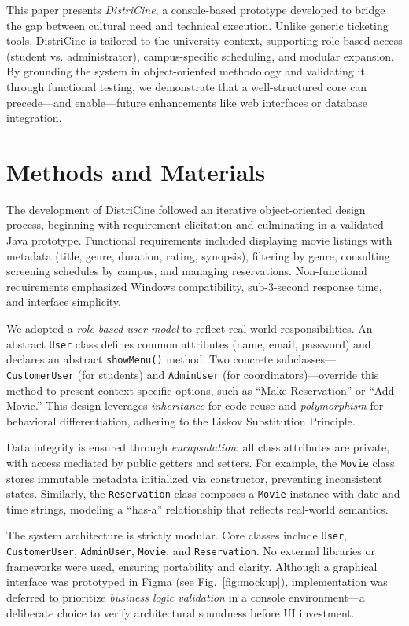 \documentclass[10pt, conference]{IEEEtran}
\begin{document}
This paper presents \textit{DistriCine}, a console-based prototype developed to bridge the gap between cultural need and technical execution. Unlike generic ticketing tools, DistriCine is tailored to the university context, supporting role-based access (student vs. administrator), campus-specific scheduling, and modular expansion. By grounding the system in object-oriented methodology and validating it through functional testing, we demonstrate that a well-structured core can precede—and enable—future enhancements like web interfaces or database integration.

\section{Methods and Materials}

The development of DistriCine followed an iterative object-oriented design process, beginning with requirement elicitation and culminating in a validated Java prototype. Functional requirements included displaying movie listings with metadata (title, genre, duration, rating, synopsis), filtering by genre, consulting screening schedules by campus, and managing reservations. Non-functional requirements emphasized Windows compatibility, sub-3-second response time, and interface simplicity.

We adopted a \textit{role-based user model} to reflect real-world responsibilities. An abstract \texttt{User} class defines common attributes (name, email, password) and declares an abstract \texttt{showMenu()} method. Two concrete subclasses—\texttt{CustomerUser} (for students) and \texttt{AdminUser} (for coordinators)—override this method to present context-specific options, such as “Make Reservation” or “Add Movie.” This design leverages \textit{inheritance} for code reuse and \textit{polymorphism} for behavioral differentiation, adhering to the Liskov Substitution Principle.

Data integrity is ensured through \textit{encapsulation}: all class attributes are private, with access mediated by public getters and setters. For example, the \texttt{Movie} class stores immutable metadata initialized via constructor, preventing inconsistent states. Similarly, the \texttt{Reservation} class composes a \texttt{Movie} instance with date and time strings, modeling a “has-a” relationship that reflects real-world semantics.

The system architecture is strictly modular. Core classes include \texttt{User}, \texttt{CustomerUser}, \texttt{AdminUser}, \texttt{Movie}, and \texttt{Reservation}. No external libraries or frameworks were used, ensuring portability and clarity. Although a graphical interface was prototyped in Figma (see Fig.~\ref{fig:mockup}), implementation was deferred to prioritize \textit{business logic validation} in a console environment—a deliberate choice to verify architectural soundness before UI investment.
\end{document}
